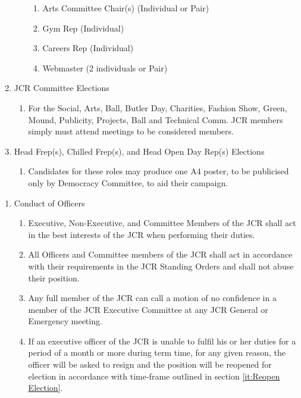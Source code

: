 \begin{enumerate}
\begin{enumerate}
\begin{enumerate}
            \item Arts Committee Chair(s) (Individual or Pair) 
            \item Gym Rep (Individual)
            \item Careers Rep (Individual) 
            \item Webmaster (2 individuals or Pair)
        \end{enumerate}
    \end{enumerate}
    \item JCR Committee Elections
    \begin{enumerate}
        \item For the Social, Arts, Ball, Butler Day, Charities, Fashion Show, Green, Mound, Publicity, Projects, Ball and Technical Comm. JCR members simply must attend meetings to be considered members.
    \end{enumerate}
    \item Head Frep(s), Chilled Frep(s), and Head Open Day Rep(s) Elections
    \begin{enumerate}
        \item Candidates for these roles may produce one A4 poster, to be publicised only by Democracy Committee, to aid their campaign.
    \end{enumerate}
\end{enumerate}

\begin{enumerate}
    \item Conduct of Officers
    \begin{enumerate}
        \item Executive, Non-Executive, and Committee Members of the JCR shall act in the best interests of the JCR when performing their duties.
        \item All Officers and Committee members of the JCR shall act in accordance with their requirements in the JCR Standing Orders and shall not abuse their position.
        \item Any full member of the JCR can call a motion of no confidence in a member of the JCR Executive Committee at any JCR General or Emergency meeting.
        \item If an executive officer of the JCR is unable to fulfil his or her duties for a period of a month or more during term time, for any given reason, the officer will be asked to resign and the position will be reopened for election in accordance with time-frame outlined in section \ref{it:Reopen Election}.
    \end{enumerate}
\end{enumerate}

